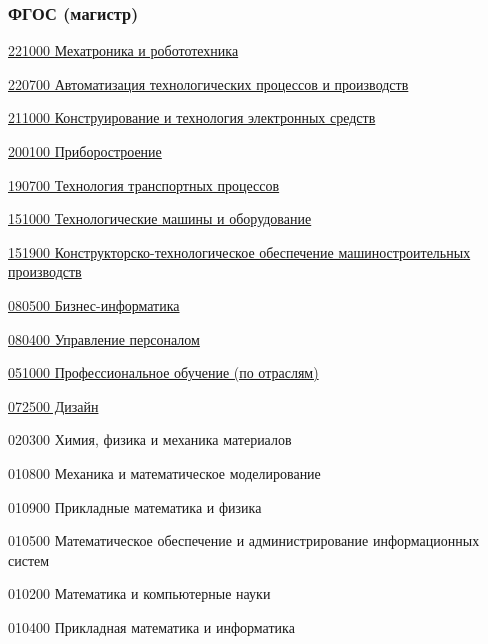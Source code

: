 \begin{thebibliography}{99}

\subsubsection{ФГОС (магистр)}

\href{http://www.edu.ru/db-mon/mo/Data/d\_09/prm702-1.pdf}{221000 Мехатроника и
робототехника}

\href{http://www.edu.ru/db-mon/mo/Data/d\_09/prm763-1.pdf}{220700 Автоматизация
технологических процессов и производств} 

\href{http://www.edu.ru/db-mon/mo/Data/d\_10/prm14-1.pdf}{211000 Конструирование
и технология электронных средств}

\href{http://www.edu.ru/db-mon/mo/Data/d\_10/prm65-1.pdf}{200100
Приборостроение}

\href{http://www.edu.ru/db-mon/mo/Data/d\_10/prm33-1.pdf}{190700 Технология
транспортных процессов}

\href{http://www.edu.ru/db-mon/mo/Data/d\_09/prm539-1.pdf}{151000
Технологические машины и оборудование}

\href{http://www.edu.ru/db-mon/mo/Data/d\_09/prm769-1.pdf}{151900
Конструкторско-технологическое обеспечение машиностроительных производств}

\href{http://www.edu.ru/db-mon/mo/Data/d\_09/prm742-1.pdf}{080500
Бизнес-информатика}

\href{http://www.edu.ru/db-mon/mo/Data/d\_10/prm2009-1.pdf}{080400 Управление
персоналом}

\href{http://www.edu.ru/db-mon/mo/Data/d\_10/prm377-1.pdf}{051000
Профессиональное обучение (по отраслям)}

\href{http://www.edu.ru/db-mon/mo/Data/d\_10/prm15-1.pdf}{072500 Дизайн}

 020300 Химия, физика и механика материалов 

 010800 Механика и математическое моделирование

 010900 Прикладные математика и физика

 010500 Математическое обеспечение и администрирование
информационных систем 

 010200 Математика и компьютерные науки

 010400 Прикладная математика и информатика

\end{thebibliography}